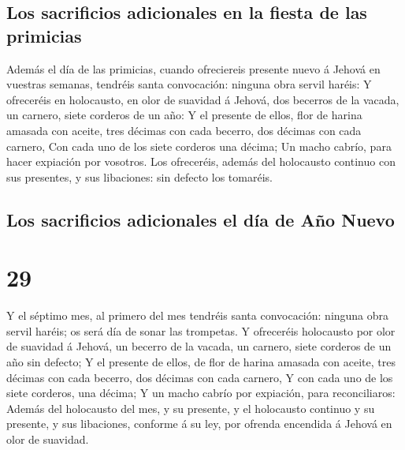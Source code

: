 \hypertarget{los-sacrificios-adicionales-en-la-fiesta-de-las-primicias}{%
\subsection{Los sacrificios adicionales en la fiesta de las
primicias}\label{los-sacrificios-adicionales-en-la-fiesta-de-las-primicias}}

 Además el día de las primicias, cuando ofreciereis
presente nuevo á Jehová en vuestras semanas, tendréis santa convocación:
ninguna obra servil haréis:  Y ofreceréis en holocausto,
en olor de suavidad á Jehová, dos becerros de la vacada, un carnero,
siete corderos de un año:  Y el presente de ellos, flor
de harina amasada con aceite, tres décimas con cada becerro, dos décimas
con cada carnero,  Con cada uno de los siete corderos una
décima;  Un macho cabrío, para hacer expiación por
vosotros.  Los ofreceréis, además del holocausto continuo
con sus presentes, y sus libaciones: sin defecto los tomaréis.

\hypertarget{los-sacrificios-adicionales-el-duxeda-de-auxf1o-nuevo}{%
\subsection{Los sacrificios adicionales el día de Año
Nuevo}\label{los-sacrificios-adicionales-el-duxeda-de-auxf1o-nuevo}}

\hypertarget{section-04-29}{%
\section{29}\label{section-04-29}}

 Y el séptimo mes, al primero del mes tendréis santa
convocación: ninguna obra servil haréis; os será día de sonar las
trompetas.  Y ofreceréis holocausto por olor de suavidad á
Jehová, un becerro de la vacada, un carnero, siete corderos de un año
sin defecto;  Y el presente de ellos, de flor de harina
amasada con aceite, tres décimas con cada becerro, dos décimas con cada
carnero,  Y con cada uno de los siete corderos, una
décima;  Y un macho cabrío por expiación, para
reconciliaros:  Además del holocausto del mes, y su
presente, y el holocausto continuo y su presente, y sus libaciones,
conforme á su ley, por ofrenda encendida á Jehová en olor de suavidad.

